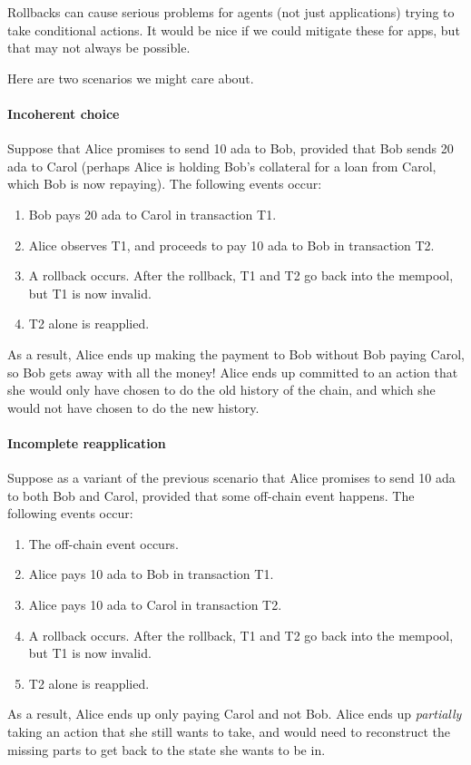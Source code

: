 \begin{requirement}
\label{req:app-rollback}
Rollbacks can cause serious problems for agents (not just applications) trying to take conditional actions.
It would be nice if we could mitigate these for \glspl{app}, but that may not always be possible.

Here are two scenarios we might care about.

\paragraph{Incoherent choice}
\label{para:incoherent-choice}
Suppose that Alice promises to send 10 \gls{ada} to Bob, provided that Bob sends 20 \gls{ada} to Carol (perhaps Alice is holding Bob's collateral for a loan from Carol, which Bob is now repaying).
The following events occur:
\begin{enumerate}
\item Bob pays 20 \gls{ada} to Carol in transaction T1.
\item Alice observes T1, and proceeds to pay 10 \gls{ada} to Bob in transaction T2.
\item A rollback occurs. After the rollback, T1 and T2 go back into the mempool, but T1 is now invalid.
\item T2 alone is reapplied.
\end{enumerate}

As a result, Alice ends up making the payment to Bob without Bob paying Carol, so Bob gets away with all the money!
Alice ends up committed to an action that she would only have chosen to do the old history of the chain, and which she would not have chosen to do the new history.

\paragraph{Incomplete reapplication}
\label{para:incomplete-reapplication}
Suppose as a variant of the previous scenario that Alice promises to send 10 \gls{ada} to both Bob and Carol, provided that some off-chain event happens.
The following events occur:
\begin{enumerate}
\item The off-chain event occurs.
\item Alice pays 10 \gls{ada} to Bob in transaction T1.
\item Alice pays 10 \gls{ada} to Carol in transaction T2.
\item A rollback occurs. After the rollback, T1 and T2 go back into the mempool, but T1 is now invalid.
\item T2 alone is reapplied.
\end{enumerate}

As a result, Alice ends up only paying Carol and not Bob.
Alice ends up \emph{partially} taking an action that she still wants to take, and would need to reconstruct the missing parts to get back to the state she wants to be in.
\end{requirement}

